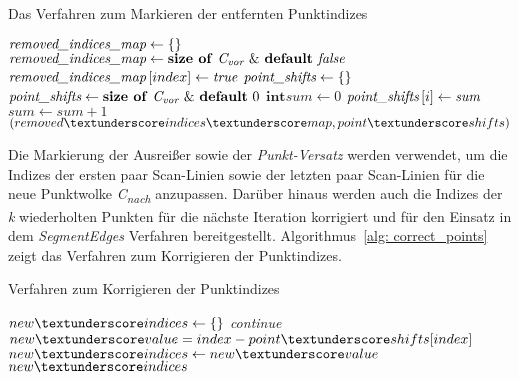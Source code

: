 \begin{algorithm}[h]
	\caption{Das Verfahren zum Markieren der entfernten Punktindizes}
	\label{alg: mark_points}
	\begin{algorithmic}[1]
		\State $\textit{removed\textunderscore indices\textunderscore map} \gets \text{\{\}}$
		\State $\textit{removed\textunderscore indices\textunderscore map} \gets \text{\textbf{size of} \textit{C\textsubscript{vor}} \& \textbf{default} \textit{false}}$
		\State $\textit{removed\textunderscore indices\textunderscore map} \left[index\right] \gets \textit{true}$
		\EndFor
		\State $\textit{point\textunderscore shifts} \gets \text{\{\}}$
		\State $\textit{point\textunderscore shifts} \gets \text{\textbf{size of} \textit{C\textsubscript{vor}} \& \textbf{default} 0}$
		\State $\textbf{int} \textit{sum} \gets 0$
		\State $\textit{point\textunderscore shifts}\left[i\right] \gets \textit{sum}$
		\Else
		\State $\textit{sum} \gets \textit{sum} + 1$
		\EndIf
		\EndFor
		\Return $(removed\textunderscore indices\textunderscore map, point\textunderscore shifts)$
		\EndFunction
	\end{algorithmic}
\end{algorithm}

Die Markierung der Ausreißer sowie der \textit{Punkt-Versatz} werden verwendet, um die Indizes der ersten paar Scan-Linien sowie der letzten paar Scan-Linien für die neue Punktwolke \textit{C\textsubscript{nach}} anzupassen. Darüber hinaus werden auch die Indizes der \textit{k} wiederholten Punkten für die nächste Iteration korrigiert und für den Einsatz in dem \textit{SegmentEdges} Verfahren bereitgestellt. Algorithmus~\ref{alg: correct_points} zeigt das Verfahren zum Korrigieren der Punktindizes.

\begin{algorithm}[h]
	\caption{Verfahren zum Korrigieren der Punktindizes}
	\label{alg: correct_points}
	\begin{algorithmic}[1]
		\State $new\textunderscore indices \gets \{\}$
		\State \textit{continue}
		\EndIf
		\State $new\textunderscore value = index - point\textunderscore shifts[index]$
		\State $new\textunderscore indices \gets new\textunderscore value$
		\EndFor
		\Return $new\textunderscore indices$
		\EndFunction
	\end{algorithmic}
\end{algorithm}

